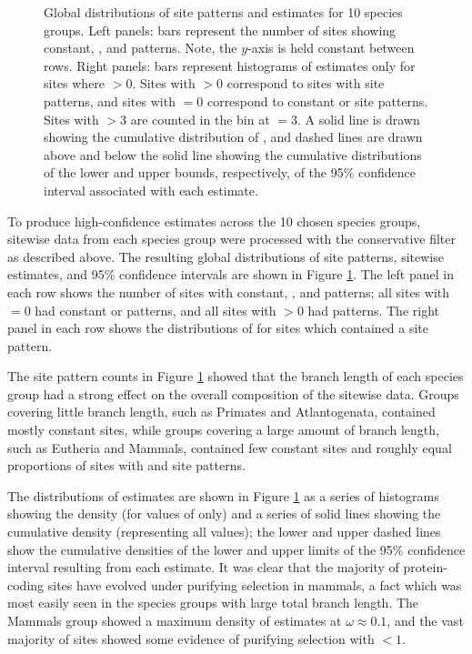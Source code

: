 \begin{figure}
\caption{\scriptsize Global distributions of site patterns and \omg
  estimates for 10 species groups. Left panels: bars represent the
  number of sites showing constant, \syn, and \nsyn patterns. Note,
  the $y$-axis is held constant between rows. Right panels: bars
  represent histograms of \omgml estimates only for sites where
  \omgml$>0$. Sites with \omgml$>0$ correspond to sites with \nsyn
  site patterns, and sites with \omgml$=0$ correspond to constant or
  \syn site patterns. Sites with \omgml$>3$ are counted in the bin at
  \omgml$=3$. A solid line is drawn showing the cumulative
  distribution of \omgml, and dashed lines are drawn above and below
  the solid line showing the cumulative distributions of the lower and
  upper bounds, respectively, of the 95\% confidence interval
  associated with each \sw estimate.}
\label{fig_global_distributions}
\end{figure}

To produce high-confidence \sw estimates across the 10 chosen species
groups, sitewise data from each species group were processed with the
conservative filter as described above. The resulting global
distributions of site patterns, sitewise \omgml estimates, and 95\%
confidence intervals are shown in Figure
\ref{fig_global_distributions}. The left panel in each row shows the
number of sites with constant, \syn, and \nsyn patterns; all sites
with \omgml$=0$ had constant or \syn patterns, and all sites with
\omgml$>0$ had \nsyn patterns. The right panel in each row shows the
distributions of \omgml for sites which contained a \nsyn site
pattern.

The site pattern counts in Figure \ref{fig_global_distributions}
showed that the branch length of each species group had a strong
effect on the overall composition of the sitewise data. Groups
covering little branch length, such as Primates and Atlantogenata,
contained mostly constant sites, while groups covering a large amount
of branch length, such as Eutheria and Mammals, contained few constant
sites and roughly equal proportions of sites with \syn and \nsyn site
patterns.

The distributions of \omgml estimates are shown in Figure
\ref{fig_global_distributions} as a series of histograms showing the
\omgml density (for \nz values of \omgml only) and a series of solid
lines showing the cumulative \omgml density (representing all values);
the lower and upper dashed lines show the cumulative densities of the
lower and upper limits of the 95\% confidence interval resulting from
each \sw estimate. It was clear that the majority of protein-coding
sites have evolved under purifying selection in mammals, a fact which
was most easily seen in the species groups with large total branch
length. The Mammals group showed a maximum density of \nz \omgml
estimates at $\omega\approx0.1$, and the vast majority of sites showed
some evidence of purifying selection with \omgml$<1$.

